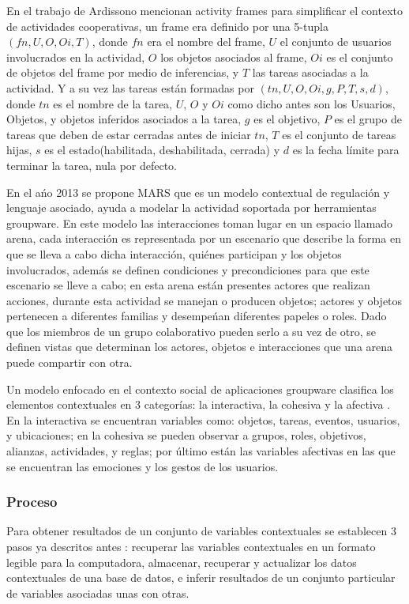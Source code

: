 En el trabajo de Ardissono \cite{ardissono2012context} mencionan activity frames para simplificar el contexto de actividades cooperativas, un frame era definido por una 5-tupla $( fn, U, O, Oi, T )$, donde $fn$ era el nombre del frame, $U$ el conjunto de usuarios involucrados en la actividad, $O$ los objetos asociados al frame, $Oi$ es el conjunto de objetos del frame por medio de inferencias, y $T$ las tareas asociadas a la actividad. Y a su vez las tareas est\'an formadas por $( tn, U, O, Oi, g, P, T, s, d )$, donde $tn$ es el nombre de la tarea, $U$, $O$ y $Oi$ como dicho antes son los Usuarios, Objetos, y objetos inferidos asociados a la tarea, $g$ es el objetivo, $P$ es el grupo de tareas que deben de estar cerradas antes de iniciar $tn$, $T$ es el conjunto de tareas hijas, $s$ es el estado(habilitada, deshabilitada, cerrada) y $d$ es la fecha l\'imite para terminar la tarea, nula por defecto.

En el a\'no 2013 se propone MARS\(\) que es un modelo contextual de regulaci\'on y lenguaje asociado, ayuda a modelar la actividad soportada por herramientas groupware. En este modelo las interacciones toman lugar en un espacio llamado arena, cada interacci\'on es representada por un escenario que describe la forma en que se lleva a cabo dicha interacci\'on, qui\'enes participan y los objetos involucrados, adem\'as se definen condiciones y precondiciones para que este escenario se lleve a cabo; en esta arena est\'an presentes actores que realizan acciones, durante esta actividad se manejan o producen objetos; actores y objetos pertenecen a diferentes familias y desempe\'nan diferentes papeles o roles. Dado que los miembros de un grupo colaborativo pueden serlo a su vez de otro, se definen vistas que determinan los actores, objetos e interacciones que una arena puede compartir con otra.

Un modelo enfocado en el contexto social de aplicaciones groupware clasifica los elementos contextuales en 3 categor\'ias: la interactiva, la cohesiva y la afectiva \cite{montane2013context}. En la interactiva se encuentran variables como: objetos, tareas, eventos, usuarios, y ubicaciones; en la cohesiva se pueden observar a grupos, roles, objetivos, alianzas, actividades, y reglas; por \'ultimo est\'an las variables afectivas en las que se encuentran las emociones y los gestos de los usuarios.	
\subsubsection{Proceso}
Para obtener resultados de un conjunto de variables contextuales se establecen 3 pasos ya descritos antes \cite{montane2013context}: recuperar las variables contextuales en un formato legible para la computadora, almacenar, recuperar y actualizar los datos contextuales de una base de datos, e inferir resultados de un conjunto particular de variables asociadas unas con otras.

